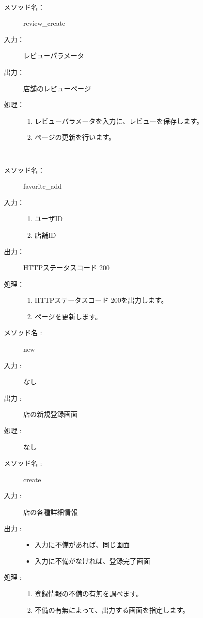 \documentclass[a4j,titlepage]{jarticle}
\begin{document}
\clearpage
​
\begin{description}
\item [メソッド名：] review\_create
\item [入力：] レビューパラメータ
\item [出力：] 店舗のレビューページ
\item [処理：]\mbox{}
  \begin{enumerate}
  \item レビューパラメータを入力に、レビューを保存します。
  \item ページの更新を行います。
  \end{enumerate}
\end{description}
​
\begin{description}
\item [メソッド名：] favorite\_add
\item [入力：]
  \begin{enumerate}
    \item ユーザID
    \item 店舗ID
  \end{enumerate}
\item [出力：] HTTPステータスコード 200
\item [処理：] \mbox{}
  \begin{enumerate}
  \item HTTPステータスコード 200を出力します。
  \item ページを更新します。
　\end{enumerate}
\end{description}

\begin{description}
  \item [メソッド名 :] new
  \item [入力 :] なし
  \item [出力 :] 店の新規登録画面
  \item [処理 :]
  なし
\end{description}

\begin{description}
  \item [メソッド名 :] create
  \item [入力 :] 店の各種詳細情報
  \item [出力 :]\mbox{}
  \begin{itemize}
    \item 入力に不備があれば、同じ画面
    \item 入力に不備がなければ、登録完了画面
  \end{itemize}
  \item [処理 :]\mbox{}
  \begin{enumerate}
    \item 登録情報の不備の有無を調べます。
    \item 不備の有無によって、出力する画面を指定します。
  \end{enumerate}
\end{description}
\end{document}
